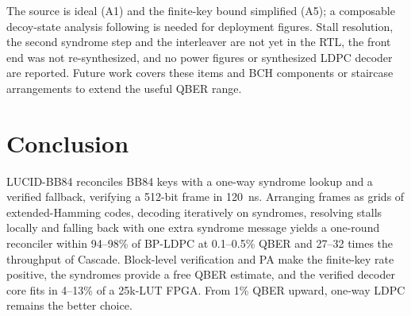 \documentclass[conference]{IEEEtran}
\begin{document}
The source is ideal (A1) and the finite-key bound simplified (A5); a composable decoy-state analysis \cite{lim2014} following \cite{tsurumaru2025} is needed for deployment figures. Stall resolution, the second syndrome step and the interleaver are not yet in the RTL, the front end was not re-synthesized, and no power figures or synthesized LDPC decoder are reported. Future work covers these items and BCH components or staircase arrangements \cite{smith2012} to extend the useful QBER range.

\section{Conclusion}\label{sec:conclusion}
LUCID-BB84 reconciles BB84 keys with a one-way syndrome lookup and a verified fallback, verifying a 512-bit frame in 120~ns. Arranging frames as grids of extended-Hamming codes, decoding iteratively on syndromes, resolving stalls locally and falling back with one extra syndrome message yields a one-round reconciler within 94--98\% of BP-LDPC at 0.1--0.5\% QBER and 27--32 times the throughput of Cascade. Block-level verification and PA make the finite-key rate positive, the syndromes provide a free QBER estimate, and the verified decoder core fits in 4--13\% of a 25k-LUT FPGA. From 1\% QBER upward, one-way LDPC remains the better choice.



\end{document}
